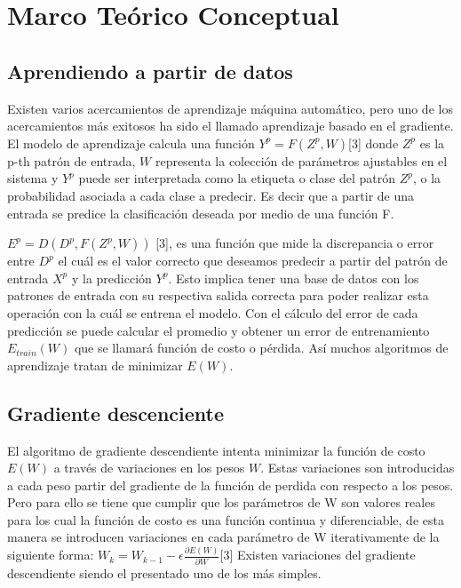 \chapter{Marco Teórico Conceptual}


\section{Aprendiendo a partir de datos}
Existen varios acercamientos de aprendizaje máquina automático, pero uno de los acercamientos más exitosos ha sido el llamado aprendizaje basado en el gradiente. El modelo de aprendizaje calcula una función $Y^p=F\left(Z^p,W\right)$[3] donde $Z^p$ es la p-th patrón de entrada, $W$ representa la colección de parámetros ajustables en el sistema y  $Y^p$ puede ser interpretada como la etiqueta o clase del patrón $Z^p$, o la probabilidad asociada a cada clase a predecir. Es decir que a partir de una entrada se predice la clasificación deseada por medio de una función F.

$E^p=D\left(D^p,F\left(Z^p,W\right)\right)$ [3], es una función que mide la discrepancia o error entre $D^p$ el cuál es el valor correcto que deseamos predecir a partir del patrón de entrada $X^p$ y la predicción $Y^p$. Esto implica tener una base de datos con los patrones de entrada con su respectiva salida correcta para poder realizar esta operación con la cuál se entrena el modelo. Con el cálculo del error de cada predicción se puede calcular el promedio y obtener un error de entrenamiento $E_{train}\left(W\right)$ que se llamará función de costo o pérdida. Así muchos algoritmos de aprendizaje tratan de minimizar $E\left(W\right)$. 


\section{Gradiente descenciente}
El algoritmo de gradiente descendiente intenta minimizar la función de costo $E\left(W\right)$ a través de variaciones en los pesos $W$. Estas variaciones son introducidas a cada peso partir del gradiente de la función de perdida con respecto a los pesos. Pero para ello se tiene que cumplir que los parámetros de W son valores reales para los cual la función de costo es una función continua y diferenciable, de esta manera se introducen variaciones en cada parámetro de W iterativamente de la siguiente forma:
$W_k=W_{k-1}-\epsilon\frac{\partial E\left(W\right)}{\partial W}$[3]
Existen variaciones del gradiente descendiente siendo el presentado uno de los más simples.

